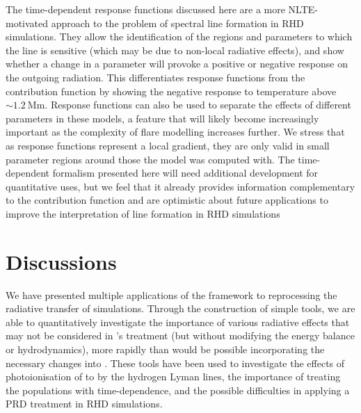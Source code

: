 The time-dependent response functions discussed here are a more NLTE-motivated approach to the problem of spectral line formation in RHD simulations.
They allow the identification of the regions and parameters to which the line is sensitive (which may be due to non-local radiative effects), and show whether a change in a parameter will provoke a positive or negative response on the outgoing radiation.
This differentiates response functions from the contribution function by showing the negative response to temperature above $\sim\SI{1.2}{\mega\m}$.
Response functions can also be used to separate the effects of different parameters in these models, a feature that will likely become increasingly important as the complexity of flare modelling increases further.
We stress that as response functions represent a local gradient, they are only valid in small parameter regions around those the model was computed with.
The time-dependent formalism presented here will need additional development for quantitative uses, but we feel that it already provides information complementary to the contribution function and are optimistic about future applications to improve the interpretation of line formation in RHD simulations

\section{Discussions}

We have presented multiple applications of the \Lw{} framework to reprocessing the radiative transfer of \Radyn{} simulations.
Through the construction of simple tools, we are able to quantitatively investigate the importance of various radiative effects that may not be considered in \Radyn{}'s treatment (but without modifying the energy balance or hydrodynamics), more rapidly than would be possible incorporating the necessary changes into \Radyn{}.
These tools have been used to investigate the effects of photoionisation of \Caii{} to \Caiii{} by the hydrogen Lyman lines, the importance of treating the \Caii{} populations with time-dependence, and the possible difficulties in applying a PRD treatment in RHD simulations.

